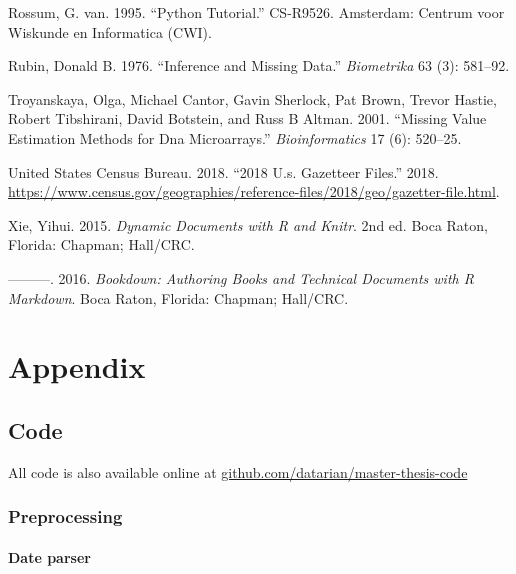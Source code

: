 \documentclass[
  11pt,
  a4paper,
  DIV=12,captions=tableheading,oneside]{scrbook}
\begin{document}
\leavevmode\hypertarget{ref-CS-R9526}{}%
Rossum, G. van. 1995. ``Python Tutorial.'' CS-R9526. Amsterdam: Centrum voor Wiskunde en Informatica (CWI).

\leavevmode\hypertarget{ref-rubin1976inference}{}%
Rubin, Donald B. 1976. ``Inference and Missing Data.'' \emph{Biometrika} 63 (3): 581--92.

\leavevmode\hypertarget{ref-troyanskaya2001missing}{}%
Troyanskaya, Olga, Michael Cantor, Gavin Sherlock, Pat Brown, Trevor Hastie, Robert Tibshirani, David Botstein, and Russ B Altman. 2001. ``Missing Value Estimation Methods for Dna Microarrays.'' \emph{Bioinformatics} 17 (6): 520--25.

\leavevmode\hypertarget{ref-census-gazet}{}%
United States Census Bureau. 2018. ``2018 U.s. Gazetteer Files.'' 2018. \url{https://www.census.gov/geographies/reference-files/2018/geo/gazetter-file.html}.

\leavevmode\hypertarget{ref-xie2015}{}%
Xie, Yihui. 2015. \emph{Dynamic Documents with R and Knitr}. 2nd ed. Boca Raton, Florida: Chapman; Hall/CRC.

\leavevmode\hypertarget{ref-xie2016bookdown}{}%
---------. 2016. \emph{Bookdown: Authoring Books and Technical Documents with R Markdown}. Boca Raton, Florida: Chapman; Hall/CRC.

\hypertarget{appendix}{%
\chapter*{Appendix}\label{appendix}}

\hypertarget{code}{%
\section{Code}\label{code}}

All code is also available online at \href{https://github.com/datarian/master-thesis-code}{github.com/datarian/master-thesis-code}

\hypertarget{preprocessing-1}{%
\subsection{Preprocessing}\label{preprocessing-1}}

\hypertarget{code-dateparser}{%
\subsubsection{Date parser}\label{code-dateparser}}
\end{document}
